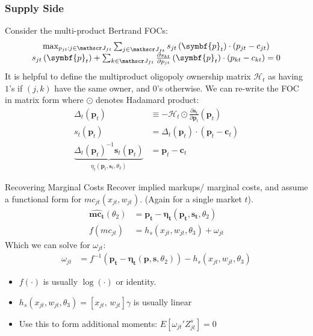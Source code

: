 \documentclass[aspectratio=169,11pt]{beamer}
\begin{document}
\begin{frame}[plain]
\frametitle{Supply Side}
\footnotesize
Consider the multi-product Bertrand FOCs:
\begin{align*}
\begin{array}{c}
\max _{p_{j t}: j \in \calJ_{f t}} \sum_{j \in \calJ_{f t}} s_{j t}\left(\symbf{p}_{t}\right) \cdot\left(p_{j t}-c_{j t}\right) \\
s_{j t}\left(\symbf{p}_{t}\right)+\sum_{k \in \calJ_{f t}} \frac{\partial s_{k t}}{\partial p_{j t}}\left(\symbf{p}_{t}\right) \cdot\left(p_{k t}-c_{k t}\right)=0
\end{array}
\end{align*}
It is helpful to define the \alert{multiproduct oligopoly ownership matrix} $\mathcal{H}_t$ as having $1$'s if $(j,k)$ have the same owner, and $0$'s otherwise. We can re-write the FOC in matrix form where $\odot$ denotes Hadamard product:
\begin{align*}
\Delta_{t}\left(\symbf{p}_{t}\right) &\equiv-\mathcal{H}_{t} \odot \frac{\partial \symbf{s}_{t}}{\partial \symbf{p}_{t}}\left(\symbf{p}_{t}\right)\\
s_{t}\left(\symbf{p}_{t}\right) &=\Delta_{t}\left(\symbf{p}_{t}\right) \cdot\left(\symbf{p}_{t}-\symbf{c}_{t}\right) \\
\underbrace{\Delta_{t}\left(\symbf{p}_{t}\right)^{-1} \symbf{s}_{t}\left(\symbf{p}_{t}\right)}_{\eta_{t}\left(\symbf{p}_{t}, \symbf{s}_{t}, \theta_{2}\right)} &=\symbf{p}_{t}-\symbf{c}_{t}
\end{align*}
\end{frame}



\begin{frame}{Recovering Marginal Costs }
Recover implied markups/ marginal costs, and assume a functional form for $mc_{jt}(x_{jt},w_{jt})$. (Again for a single market $t$).
\begin{align*}
\widehat{\symbf{mc_t}}(\theta_2)&= \symbf{p_t}- \symbf{\eta_t}(\symbf{p_t},\symbf{s_t},\theta_2)\\
f(mc_{jt}) &= h_s(x_{jt} , w_{jt},\theta_3)+ \omega_{jt}
\end{align*}
Which we can solve for $\omega_{jt}$:
\begin{align*}
\omega_{jt} &=  f^{-1}(\symbf{p_t}- \symbf{\eta_t}(\symbf{p},\symbf{s},\theta_2)) - h_s(x_{jt},w_{jt},\theta_3)
\end{align*}
\vspace{-0.4cm}
\begin{itemize}
\item $f(\cdot)$ is usually $\log(\cdot)$ or identity.
\item $h_s(x_{jt},w_{jt},\theta_3) = [x_{jt}, \, w_{jt}] \gamma$ is usually linear
\item Use this to form additional moments: $E[\omega_{jt}' Z_{jt}^{s}]=0$
\end{itemize}
\end{frame}
\end{document}
